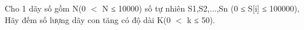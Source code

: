 Cho 1 dãy số gồm N(0 $<$ N ≤ 10000) số tự nhiên S1,S2,...,Sn (0 ≤ S[i] ≤ 100000), Hãy đếm số lượng dãy con tăng có độ dài K(0 $<$ k ≤ 50).